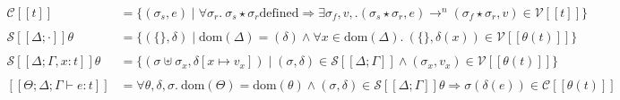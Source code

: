\documentclass[11pt]{article}%
\newcommand{\den}[2]{ \mathcal{#1} [\![ #2 ]\!] }%
\newcommand{\V}[1]{ \den{V}{#1} }%
\newcommand{\C}[1]{ \den{C}{#1} }%
\newcommand{\dom}{\mathrm{dom}}%
\newcommand{\empH}{\{\}}%
\begin{document}
\begin{align*}
    \C{ t } &= \{ (\sigma_s, e) \mid \forall \sigma_r.\ \sigma_s \star \sigma_r \mathrm{ defined } \Rightarrow \exists \sigma_f, v, . (\sigma_s \star \sigma_r, e) \rightarrow^n (\sigma_f \star \sigma_r, v) \in \V{ t } \} \\
\\
    \den{S}{ \Delta ; \cdot } \theta &= \{ (\empH, \delta) \mid \dom(\Delta) = (\delta) \wedge \forall x \in \dom(\Delta).\ (\empH, \delta(x)) \in \V{ \theta(t) } \} \\
\\
    \den{S}{ \Delta ; \Gamma , x : t } \theta &= \{ (\sigma \uplus \sigma_x, \delta[x \mapsto v_x ]) \mid (\sigma, \delta) \in \den{S}{ \Delta; \Gamma } \wedge (\sigma_x, v_x) \in \V{ \theta(t) } \} \\
\\
    \den{}{ \Theta; \Delta ; \Gamma \vdash e : t } &= \forall \theta, \delta, \sigma.\ \dom(\Theta) = \dom(\theta) \wedge (\sigma, \delta) \in  \den{S}{ \Delta; \Gamma }\theta \Rightarrow \sigma(\delta(e)) \in \C{ \theta(t) }
\end{align*}
\end{document}
